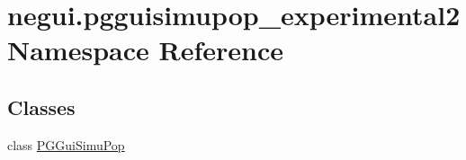 \hypertarget{namespacenegui_1_1pgguisimupop__experimental2}{}\section{negui.\+pgguisimupop\+\_\+experimental2 Namespace Reference}
\label{namespacenegui_1_1pgguisimupop__experimental2}
\subsection*{Classes}
\begin{DoxyCompactItemize}
\item 
class \hyperlink{classnegui_1_1pgguisimupop__experimental2_1_1PGGuiSimuPop}{P\+G\+Gui\+Simu\+Pop}
\end{DoxyCompactItemize}
